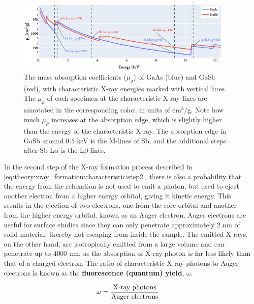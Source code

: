 \begin{figure}[phtb]
    \centering
    \includegraphics[width=0.95\textwidth]{figures/mass_absorption_coefficients.pdf}
    \caption{
        The mass absorption coefficients ($\mu_\rho$) of GaAs (blue) and GaSb (red), with characteristic X-ray energies marked with vertical lines.
        The $\mu_\rho$ of each specimen at the characteristic X-ray lines are annotated in the corresponding color, in units of cm$^2$/g.
        Note how much $\mu_\rho$ increases at the absorption edge, which is slightly higher than the energy of the characteristic X-ray.
        The absorption edge in GaSb around $0.5$ keV is the M-lines of Sb, and the additional steps after Sb L$\alpha$ is the L$\beta$ lines.
    }
    \label{fig:mass_absorption_coefficients}
\end{figure}


In the second step of the X-ray formation process described in \cref{eq:theory:xray_formation:characteristic:step2}, there is also a probability that the energy from the relaxation is not used to emit a photon, but used to eject another electron from a higher energy orbital, giving it kinetic energy.
This results in the ejection of two electrons, one from the core orbital and another from the higher energy orbital, known as an Auger electron.
Auger electrons are useful for surface studies since they can only penetrate approximately $2$ nm of solid material, thereby not escaping from inside the sample.
The emitted X-rays, on the other hand, are isotropically emitted from a large volume and can penetrate up to $4000$ nm, as the absorption of X-ray photon is far less likely than that of a charged electron. %
The ratio of characteristic X-ray photons to Auger electrons is known as the \textbf{fluorescence (quantum) yield}, $\omega$.

\begin{equation}
    \label{eq:theory:theoreticalxray:yield}
    \omega = \frac{\textnormal{X-ray photons}}{\textnormal{Auger electrons}}
\end{equation}

